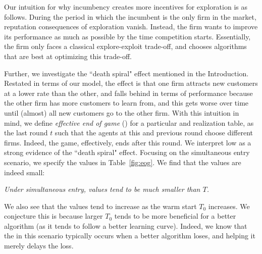\documentclass[../competing_bandits_with_appendix.tex]{subfiles}
\begin{document}

Our intuition for why incumbency creates more incentives for exploration is as follows. During the period in which the incumbent is the only firm in the market, reputation consequences of exploration vanish. Instead, the firm wants to improve its performance as much as possible by the time competition starts. Essentially, the firm only faces a classical explore-exploit trade-off, and chooses algorithms that are best at optimizing this trade-off.

Further, we investigate the ``death spiral" effect mentioned in the Introduction. Restated in terms of our model, the effect is that one firm attracts new customers at a lower rate than the other, and falls behind in terms of performance because the other firm has more customers to learn from, and this gets worse over time until (almost) all new customers go to the other firm. With this intuition in mind, we define  \textit{effective end of game} (\Eeog) for a particular \MRV and realization table, as the last round $t$ such that the agents at this and previous round choose different firms. Indeed, the game, effectively, ends after this round. We interpret low \Eeog as a strong evidence of the ``death spiral" effect. Focusing on the simultaneous entry scenario, we specify the \Eeog values in Table~\ref{fig:eog}. We find that the \Eeog values are indeed small:

\begin{finding}
\textit{
Under simultaneous entry, \Eeog values tend to be much smaller than $T$.
}
\end{finding}

We also see that the \Eeog values tend to increase as the warm start $T_0$ increases. We conjecture this is because larger $T_0$ tends to be more beneficial for a better algorithm (as it tends to follow a better learning curve). Indeed, we know that the \Eeog in this scenario typically occurs when a better algorithm loses, and helping it merely delays the loss.
\end{document}
